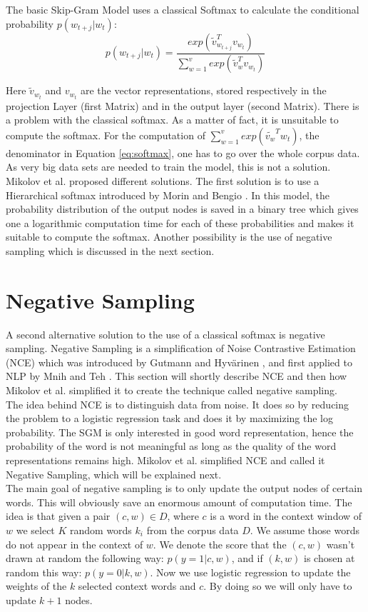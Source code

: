 The basic Skip-Gram Model uses a classical Softmax to calculate the conditional probability $p(w_{t+j}|w_t)$:
\begin{equation} \label{eq:softmax}
p(w_{t+j}|w_t)= \frac{exp( \tilde{v}_{w_{t+j}}^Tv_{w_t})}{\sum_{w=1}^v exp(\tilde{v}_w^Tv_{ w_t})}
\end{equation}

Here $\tilde{v}_{w_t}$ and $ v_{w_t}$ are the vector representations, stored respectively in the projection Layer (first Matrix) and in the output layer (second Matrix). There is a problem with the classical softmax. As a matter of fact, it is unsuitable to compute the softmax. For the computation of $\sum_{w=1}^v exp(\tilde{v_w}^T w_t)$, the denominator in Equation \ref{eq:softmax}, one has to go over the whole corpus data. As very big data sets are needed to train the model, this is not a solution. Mikolov et al. \cite{mikolov2} proposed different solutions. The first solution is to use a Hierarchical softmax introduced by Morin and Bengio \cite{hsoftmax}. In this model, the probability distribution of the output nodes is saved in a binary tree which gives one a logarithmic computation time for each of these probabilities and makes it suitable to compute the softmax. Another possibility is the use of negative sampling which is discussed in the next section.

\section{Negative Sampling}
A second alternative solution to the use of a classical softmax is negative sampling. Negative Sampling is a simplification of Noise Contrastive Estimation (NCE) which was introduced by Gutmann and Hyv{\"a}rinen \cite{nce-original}, and first applied to NLP by Mnih and Teh \cite{mnih}. This section will shortly describe NCE and then how Mikolov et al. \cite{mikolov2} simplified it to create the technique called negative sampling. \\ The idea behind NCE is to distinguish data from noise. It does so by reducing the problem to a logistic regression task and does it by maximizing the log probability. The SGM is only interested in good word representation, hence the probability of the word is not meaningful as long as the quality of the word representations remains high. Mikolov et al. \cite{mikolov2} simplified NCE and called it Negative Sampling, which will be explained next.\\
The main goal of negative sampling is to only update the output nodes of certain words. This will obviously save an enormous amount of computation time. The idea is that given a pair $(c,w) \in D$, where $c$ is a word in the context window of $w$ we select $K$ random words $k_i$ from the corpus data $D$. We assume those words do not appear in the context of $w$. We denote the score that the $(c,w)$ wasn't drawn at random the following way: $p(y=1|c,w)$, and if $(k,w) $ is chosen at random this way: $p(y=0|k,w)$. Now we use logistic regression to update the weights of the $k$ selected context words and $c$. By doing so we will only have to update $k+1$ nodes.

